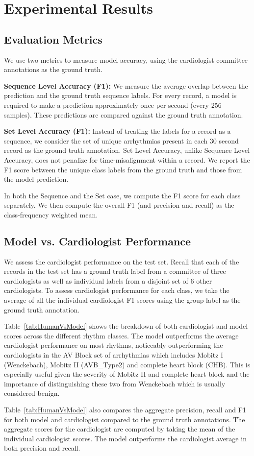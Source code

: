 \section{Experimental Results}

\subsection*{Evaluation Metrics}
We use two metrics to measure model accuracy, using the cardiologist committee
annotations as the ground truth.

\textbf{Sequence Level Accuracy (F1):} We measure the average overlap between
the prediction and the ground truth sequence labels. For every record, a model
is required to make a prediction approximately once per second (every 256
samples). These predictions are compared against the ground truth annotation.

\textbf{Set Level Accuracy (F1):} Instead of treating the labels for a record
as a sequence, we consider the set of unique arrhythmias present in each 30
second record as the ground truth annotation. Set Level Accuracy, unlike
Sequence Level Accuracy, does not penalize for time-misalignment within a
record. We report the F1 score between the unique class labels from the ground
truth and those from the model prediction.

In both the Sequence and the Set case, we compute the F1 score for each class
separately. We then compute the overall F1 (and precision and recall) as the
class-frequency weighted mean.

\subsection*{Model vs. Cardiologist Performance} We assess the cardiologist
performance on the test set. Recall that each of the records in the test set
has a ground truth label from a committee of three cardiologists as well as
individual labels from a disjoint set of 6 other cardiologists. To assess
cardiologist performance for each class, we take the average of all the
individual cardiologist F1 scores using the group label as the ground truth
annotation.

Table~\ref{tab:HumanVsModel} shows the breakdown of both cardiologist and model
scores across the different rhythm classes. The model outperforms the average
cardiologist performance on most rhythms, noticeably outperforming the
cardiologists in the AV Block set of arrhythmias which includes Mobitz I
(Wenckebach), Mobitz II (AVB\_Type2) and complete heart block (CHB). This is
especially useful given the severity of Mobitz II and complete heart block and
the importance of distinguishing these two from Wenckebach which is usually
considered benign.

Table~\ref{tab:HumanVsModel} also compares the aggregate precision, recall and
F1 for both  model and cardiologist compared to the ground truth annotations.
The aggregate scores for the cardiologist are computed by taking the mean of
the individual cardiologist scores. The model outperforms the cardiologist
average in both precision and recall.
